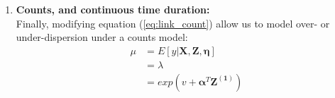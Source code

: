 \begin{enumerate}
	
	\item \textbf{Counts, and continuous time duration:} \\
	Finally, modifying equation (\ref{eq:link_count}) allow us to model over- or under-dispersion under a counts model:
	\begin{equation} \label{eq:link_count1}
		\begin{split}
			\mu &= E[y | \mathbf{X}, \mathbf{Z}, \pmb{\eta}] \\
			&= \lambda \\
			&= exp(v + \pmb{\alpha}^{T}\mathbf{Z^{(1)}})
		\end{split}
	\end{equation}

\end{enumerate}






